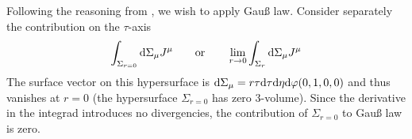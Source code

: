 Following the reasoning from \cite{KirchnerEtAl_2023}, we wish to apply Gauß law. Consider separately the contribution on the $\tau$-axis
\begin{equation*}
    \int_{\Sigma_{r=0}}\text{d}\Sigma_\mu J^\mu\qquad\text{or}\qquad\lim_{r\to 0}\int_{\Sigma_{r}}\text{d}\Sigma_\mu J^\mu
\end{equation*}
The surface vector on this hypersurface is $\text{d}\Sigma_\mu=r\tau\text{d}\tau\text{d}\eta\text{d}\varphi(0,1,0,0)$ and thus vanishes at $r=0$ (the hypersurface $\Sigma_{r=0}$ has zero $3$-volume). Since the derivative in the integrad introduces no divergencies, the contribution of $\Sigma_{r=0}$ to Gauß law is zero.

